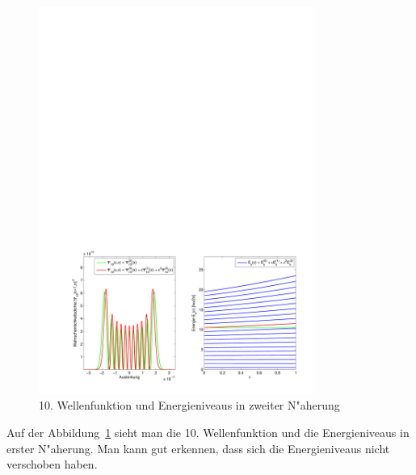 \begin{refsection}
\begin{figure}[h]	%
\centering
\includegraphics[width=0.8\textwidth]{anharmonisch/images/x4/Stoerung2Wellenfunktion.pdf}
\caption{10. Wellenfunktion und Energieniveaus in zweiter N"aherung
\label{skript:x4_Stoerung1Wellenfunktion}}
\end{figure}

Auf der Abbildung~\ref{skript:x4_Stoerung1Wellenfunktion} sieht man die 10. Wellenfunktion und die Energieniveaus in erster N"aherung. Man kann gut erkennen, dass sich die Energieniveaus nicht verschoben haben.


\end{refsection}
